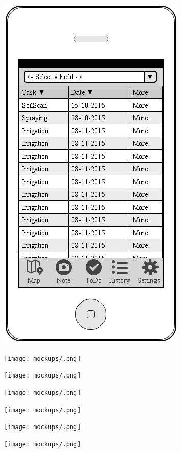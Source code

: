 \documentclass[12pt]{article}
\begin{document}
\begin{figure}[ht]
	\includegraphics[width=\linewidth, height=0.4\textheight, keepaspectratio=true]{mockups/ToDo.png}
	\caption{}
	\endminipage\hfill
\end{figure}
\begin{figure}[ht]
	\centering
	\texttt{[image: mockups/.png]}
	\caption{}
	\endminipage\hfill
	\centering
	\texttt{[image: mockups/.png]}
	\caption{}
	\endminipage\hfill
	\centering
	\texttt{[image: mockups/.png]}
	\caption{}
	\endminipage\hfill
\end{figure}\begin{figure}[ht]
\centering
\texttt{[image: mockups/.png]}
\caption{}
\endminipage\hfill
{}
\centering
\texttt{[image: mockups/.png]}
\caption{}
\endminipage\hfill
{}
\centering
\texttt{[image: mockups/.png]}
\caption{}
\endminipage\hfill
\end{figure}
\end{document}
